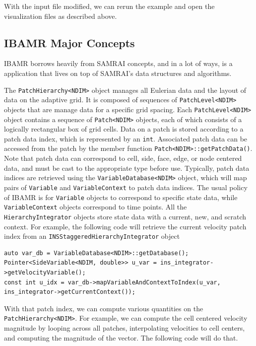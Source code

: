 \documentclass{article}
\begin{document}
With the input file modified, we can rerun the example and open the visualization files as described above.

\subsection{IBAMR Major Concepts}
IBAMR borrows heavily from SAMRAI concepts, and in a lot of ways, is a application that lives on top of SAMRAI's data structures and algorithms.

The \verb|PatchHierarchy<NDIM>| object manages all Eulerian data and the layout of data on the adaptive grid. It is composed of sequences of \verb|PatchLevel<NDIM>| objects that are manage data for a specific grid spacing. Each \verb|PatchLevel<NDIM>| object contains a sequence of \verb|Patch<NDIM>| objects, each of which consists of a logically rectangular box of grid cells. Data on a patch is stored according to a patch data index, which is represented by an \verb|int|. Associated patch data can be accessed from the patch by the member function \verb|Patch<NDIM>::getPatchData()|. Note that patch data can correspond to cell, side, face, edge, or node centered data, and must be cast to the appropriate type before use. Typically, patch data indices are retrieved using the \verb|VariableDatabase<NDIM>| object, which will map pairs of \verb|Variable| and \verb|VariableContext| to patch data indices. The usual policy of IBAMR is for \verb|Variable| objects to correspond to specific state data, while \verb|VariableContext| objects correspond to time points. All the \verb|HierarchyIntegrator| objects store state data with a current, new, and scratch context. For example, the following code will retrieve the current velocity patch index from an \verb|INSStaggeredHierarchyIntegrator| object
\begin{verbatim}
auto var_db = VariableDatabase<NDIM>::getDatabase();
Pointer<SideVariable<NDIM, double>> u_var = ins_integrator->getVelocityVariable();
const int u_idx = var_db->mapVariableAndContextToIndex(u_var, ins_integrator->getCurrentContext());
\end{verbatim}
With that patch index, we can compute various quantities on the \verb|PatchHierarchy<NDIM>|. For example, we can compute the cell centered velocity magnitude by looping across all patches, interpolating velocities to cell centers, and computing the magnitude of the vector. The following code will do that.
\end{document}
